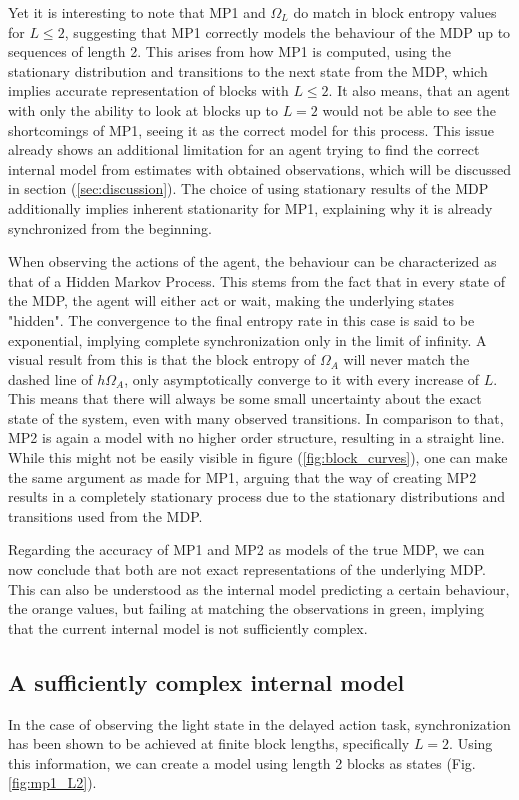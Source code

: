 \documentclass[12pt,a4paper]{article}
\begin{document}
Yet it is interesting to note that MP1 and $\Omega_L$ do match in block entropy values for $L \leq 2$, suggesting that MP1 correctly models the behaviour of the MDP up to sequences of length 2.
This arises from how MP1 is computed, using the stationary distribution and transitions to the next state from the MDP, which implies accurate representation of blocks with $L\leq 2$.
It also means, that an agent with only the ability to look at blocks up to $L=2$ would not be able to see the shortcomings of MP1, seeing it as the correct model for this process.
This issue already shows an additional limitation for an agent trying to find the correct internal model from estimates with obtained observations, which will be discussed in section (\ref{sec:discussion}).
The choice of using stationary results of the MDP additionally implies inherent stationarity for MP1, explaining why it is already synchronized from the beginning.

When observing the actions of the agent, the behaviour can be characterized as that of a Hidden Markov Process.
This stems from the fact that in every state of the MDP, the agent will either act or wait, making the underlying states "hidden".
The convergence to the final entropy rate in this case is said to be exponential, implying complete synchronization only in the limit of infinity.
A visual result from this is that the block entropy of $\Omega_A$ will never match the dashed line of $h \Omega_A$, only asymptotically converge to it with every increase of $L$.
This means that there will always be some small uncertainty about the exact state of the system, even with many observed transitions.
In comparison to that, MP2 is again a model with no higher order structure, resulting in a straight line.
While this might not be easily visible in figure (\ref{fig:block_curves}), one can make the same argument as made for MP1, arguing that the way of creating MP2 results in a completely stationary process due to the stationary distributions and transitions used from the MDP.

Regarding the accuracy of MP1 and MP2 as models of the true MDP, we can now conclude that both are not exact representations of the underlying MDP.
This can also be understood as the internal model predicting a certain behaviour, the orange values, but failing at matching the observations in green, implying that the current internal model is not sufficiently complex.

\subsection{A sufficiently complex internal model} \label{ssec:sufficient_internal_model}
In the case of observing the light state in the delayed action task, synchronization has been shown to be achieved at finite block lengths, specifically $L=2$.
Using this information, we can create a model using length 2 blocks as states (Fig. \ref{fig:mp1_L2}).
\end{document}

